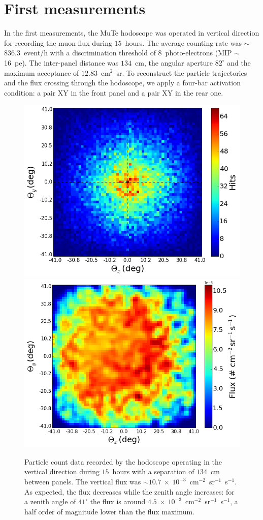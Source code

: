 \documentclass[letterpaper,11pt]{article}
\begin{document}
\section{First measurements}
\label{measurement}

In the first measurements, the MuTe hodoscope was operated in vertical direction for recording the muon flux during $15$~hours. The average counting rate was $\sim$836.3~event/h with a discrimination threshold of $8$~photo-electrons (MIP $\sim$16~pe). The inter-panel distance was $134$~cm, the angular aperture $82^{\circ}$ and the maximum acceptance of $12.83$~cm$^{2}$~sr. To reconstruct the particle trajectories and the flux crossing through the hodoscope, we apply a four-bar activation condition: a pair XY in the front panel and a pair XY in the rear one. 


\begin{figure}[htb]
\centering
\includegraphics[width=0.48\columnwidth]{Figures/Hits_15h.png}
\includegraphics[width=0.49\columnwidth]{Figures/Flux.png}
\caption{Particle count data recorded by the hodoscope operating in the vertical direction during $15$~hours with a separation of $134$~cm between panels. The vertical flux was $\sim 10.7~\times~10^{-3}$~cm$^{-2}$~sr$^{-1}$~s$^{-1}$. As expected, the flux decreases while the zenith angle increases: for a zenith angle of $41^{\circ}$ the flux is around $4.5~\times~10^{-3}$~cm$^{-2}$~sr$^{-1}$~s$^{-1}$, a half order of magnitude lower than the flux maximum.}
\label{fig:hits_15}
\end{figure}
\end{document}
